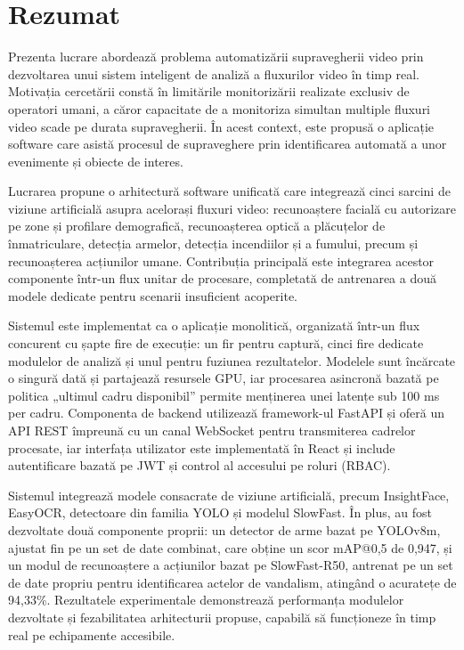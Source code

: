 \chapter*{Rezumat}

\thispagestyle{front}

Prezenta lucrare abordează problema automatizării supravegherii video prin dezvoltarea unui sistem inteligent de analiză a fluxurilor video în timp real. Motivația cercetării constă în limitările monitorizării realizate exclusiv de operatori umani, a căror capacitate de a monitoriza simultan multiple fluxuri video scade pe durata supravegherii. În acest context, este propusă o aplicație software care asistă procesul de supraveghere prin identificarea automată a unor evenimente și obiecte de interes.

Lucrarea propune o arhitectură software unificată care integrează cinci sarcini de viziune artificială asupra acelorași fluxuri video: recunoaștere facială cu autorizare pe zone și profilare demografică, recunoașterea optică a plăcuțelor de înmatriculare, detecția armelor, detecția incendiilor și a fumului, precum și recunoașterea acțiunilor umane. Contribuția principală este integrarea acestor componente într-un flux unitar de procesare, completată de antrenarea a două modele dedicate pentru scenarii insuficient acoperite.

Sistemul este implementat ca o aplicație monolitică, organizată într-un flux concurent cu șapte fire de execuție: un fir pentru captură, cinci fire dedicate modulelor de analiză și unul pentru fuziunea rezultatelor. Modelele sunt încărcate o singură dată și partajează resursele GPU, iar procesarea asincronă bazată pe politica „ultimul cadru disponibil” permite menținerea unei latențe sub 100 ms per cadru. Componenta de backend utilizează framework-ul FastAPI și oferă un API REST împreună cu un canal WebSocket pentru transmiterea cadrelor procesate, iar interfața utilizator este implementată în React și include autentificare bazată pe JWT și control al accesului pe roluri (RBAC).

Sistemul integrează modele consacrate de viziune artificială, precum InsightFace, EasyOCR, detectoare din familia YOLO și modelul SlowFast. În plus, au fost dezvoltate două componente proprii: un detector de arme bazat pe YOLOv8m, ajustat fin pe un set de date combinat, care obține un scor mAP@0,5 de 0,947, și un modul de recunoaștere a acțiunilor bazat pe SlowFast-R50, antrenat pe un set de date propriu pentru identificarea actelor de vandalism, atingând o acuratețe de 94,33\%. Rezultatele experimentale demonstrează performanța modulelor dezvoltate și fezabilitatea arhitecturii propuse, capabilă să funcționeze în timp real pe echipamente accesibile.

